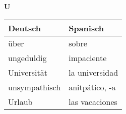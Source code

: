 \begin{flushright}\begin{Huge}\textbf{U}\end{Huge}\end{flushright}

\begin{longtable}{p{} p{}} 
\textbf{Deutsch}     & \textbf{Spanisch}                                       \\ \hline
\hline
\endhead %
über & sobre\\
ungeduldig & impaciente\\
Universität & la universidad\\
unsympathisch & anitpático, -a\\
Urlaub & las vacaciones\\

\end{longtable}
